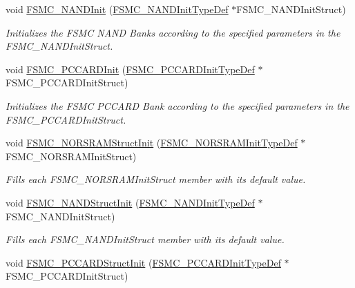 \begin{DoxyCompactItemize}
void \mbox{\hyperlink{group___f_s_m_c___exported___functions_ga9f81ccc4e126c11f1eb33077b1a68e6f}{F\+S\+M\+C\+\_\+\+N\+A\+N\+D\+Init}} (\mbox{\hyperlink{struct_f_s_m_c___n_a_n_d_init_type_def}{F\+S\+M\+C\+\_\+\+N\+A\+N\+D\+Init\+Type\+Def}} $\ast$F\+S\+M\+C\+\_\+\+N\+A\+N\+D\+Init\+Struct)
\begin{DoxyCompactList}\small\item\em Initializes the F\+S\+MC N\+A\+ND Banks according to the specified parameters in the F\+S\+M\+C\+\_\+\+N\+A\+N\+D\+Init\+Struct. \end{DoxyCompactList}\item 
void \mbox{\hyperlink{group___f_s_m_c___exported___functions_gacee1351363e7700a296faa1734a910aa}{F\+S\+M\+C\+\_\+\+P\+C\+C\+A\+R\+D\+Init}} (\mbox{\hyperlink{struct_f_s_m_c___p_c_c_a_r_d_init_type_def}{F\+S\+M\+C\+\_\+\+P\+C\+C\+A\+R\+D\+Init\+Type\+Def}} $\ast$F\+S\+M\+C\+\_\+\+P\+C\+C\+A\+R\+D\+Init\+Struct)
\begin{DoxyCompactList}\small\item\em Initializes the F\+S\+MC P\+C\+C\+A\+RD Bank according to the specified parameters in the F\+S\+M\+C\+\_\+\+P\+C\+C\+A\+R\+D\+Init\+Struct. \end{DoxyCompactList}\item 
void \mbox{\hyperlink{group___f_s_m_c___exported___functions_gaf33e6dfc34f62d16a0cb416de9e83d28}{F\+S\+M\+C\+\_\+\+N\+O\+R\+S\+R\+A\+M\+Struct\+Init}} (\mbox{\hyperlink{struct_f_s_m_c___n_o_r_s_r_a_m_init_type_def}{F\+S\+M\+C\+\_\+\+N\+O\+R\+S\+R\+A\+M\+Init\+Type\+Def}} $\ast$F\+S\+M\+C\+\_\+\+N\+O\+R\+S\+R\+A\+M\+Init\+Struct)
\begin{DoxyCompactList}\small\item\em Fills each F\+S\+M\+C\+\_\+\+N\+O\+R\+S\+R\+A\+M\+Init\+Struct member with its default value. \end{DoxyCompactList}\item 
void \mbox{\hyperlink{group___f_s_m_c___exported___functions_ga8283ad94ad8e83d49d5b77d1c7e17862}{F\+S\+M\+C\+\_\+\+N\+A\+N\+D\+Struct\+Init}} (\mbox{\hyperlink{struct_f_s_m_c___n_a_n_d_init_type_def}{F\+S\+M\+C\+\_\+\+N\+A\+N\+D\+Init\+Type\+Def}} $\ast$F\+S\+M\+C\+\_\+\+N\+A\+N\+D\+Init\+Struct)
\begin{DoxyCompactList}\small\item\em Fills each F\+S\+M\+C\+\_\+\+N\+A\+N\+D\+Init\+Struct member with its default value. \end{DoxyCompactList}\item 
void \mbox{\hyperlink{group___f_s_m_c___exported___functions_ga7a64ba0e0545b3f1913c9d1d28c05e62}{F\+S\+M\+C\+\_\+\+P\+C\+C\+A\+R\+D\+Struct\+Init}} (\mbox{\hyperlink{struct_f_s_m_c___p_c_c_a_r_d_init_type_def}{F\+S\+M\+C\+\_\+\+P\+C\+C\+A\+R\+D\+Init\+Type\+Def}} $\ast$F\+S\+M\+C\+\_\+\+P\+C\+C\+A\+R\+D\+Init\+Struct)

\end{DoxyCompactItemize}
